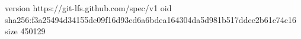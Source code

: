 version https://git-lfs.github.com/spec/v1
oid sha256:f3a25494d34155de09f16d93ed6a6bdea164304da5d981b517ddee2b61c74c16
size 450129
